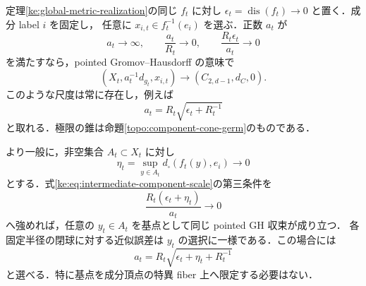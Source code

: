 \begin{corollary}[選択した中間尺度での成分錐]
\label{ke:intermediate-component-cone}
定理\ref{ke:global-metric-realization}の同じ $f_t$ に対し
$\epsilon_t=\operatorname{dis}(f_t)\to0$ と置く．成分 label $i$ を固定し，
任意に $x_{i,t}\in f_t^{-1}(e_i)$ を選ぶ．正数 $a_t$ が
\begin{equation}\label{ke:eq:intermediate-component-scale}
 a_t\longrightarrow\infty,\qquad
 \frac{a_t}{R_t}\longrightarrow0,\qquad
 \frac{R_t\epsilon_t}{a_t}\longrightarrow0
\end{equation}
を満たすなら，pointed Gromov--Hausdorff の意味で
\[
 (X_t,a_t^{-1}d_{g_t},x_{i,t})
 \longrightarrow (C_{2,d-1},d_C,0).
\]
このような尺度は常に存在し，例えば
\begin{equation}\label{ke:eq:intermediate-component-choice}
 a_t=R_t\sqrt{\epsilon_t+R_t^{-1}}
\end{equation}
と取れる．極限の錐は命題\ref{topo:component-cone-germ}のものである．

より一般に，非空集合 $A_t\subset X_t$ に対し
\[
 \eta_t=\sup_{y\in A_t}d_\square(f_t(y),e_i)\longrightarrow0
\]
とする．式\eqref{ke:eq:intermediate-component-scale}の第三条件を
\begin{equation}\label{ke:eq:intermediate-basepoint-budget}
 \frac{R_t(\epsilon_t+\eta_t)}{a_t}\longrightarrow0
\end{equation}
へ強めれば，任意の $y_t\in A_t$ を基点として同じ pointed GH 収束が成り立つ．
各固定半径の閉球に対する近似誤差は $y_t$ の選択に一様である．この場合には
\[
 a_t=R_t\sqrt{\epsilon_t+\eta_t+R_t^{-1}}
\]
と選べる．特に基点を成分頂点の特異 fiber 上へ限定する必要はない．
\end{corollary}
